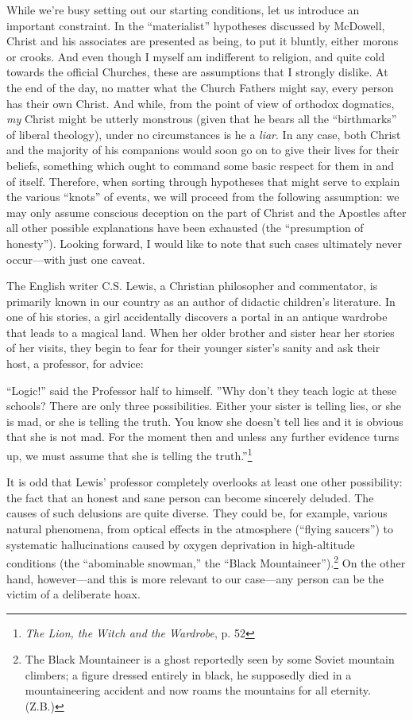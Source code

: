 While we're busy setting out our starting conditions, let us introduce an important constraint. In the ``materialist'' hypotheses discussed by McDowell, Christ and his associates are presented as being, to put it bluntly, either morons or crooks. And even though I myself am indifferent to religion, and quite cold towards the official Churches, these are assumptions that I strongly dislike. At the end of the day, no matter what the Church Fathers might say, every person has their own Christ. And while, from the point of view of orthodox dogmatics, \emph{my} Christ might be utterly monstrous (given that he bears all the ``birthmarks'' of liberal theology), under no circumstances is he a \emph{liar}. In any case, both Christ and the majority of his companions would soon go on to give their lives for their beliefs, something which ought to command some basic respect for them in and of itself. Therefore, when sorting through hypotheses that might serve to explain the various ``knots'' of events, we will proceed from the following assumption: we may only assume conscious deception on the part of Christ and the Apostles after all other possible explanations have been exhausted (the ``presumption of honesty''). Looking forward, I would like to note that such cases ultimately never occur---with just one caveat.

The English writer C.S. Lewis, a Christian philosopher and commentator, is
primarily known in our country as an author of didactic children's literature. In
one of his stories, a girl accidentally discovers a portal in an antique wardrobe that
leads to a magical land. When her older brother and sister hear her stories of her
visits, they begin to fear for their younger sister's sanity and ask their host, a
professor, for advice:

\begin{smallquote}
    ``Logic!'' said the Professor half to himself. ''Why don't they teach logic at these schools? There are only three possibilities. Either your sister is telling lies, or she is mad, or she is telling the truth. You know she doesn't tell lies and it is obvious that she is not mad. For the moment then and unless any further evidence turns up, we must assume that she is telling the truth.''\footnote{\emph{The Lion, the Witch and the Wardrobe}, p. 52}
\end{smallquote}

It is odd that Lewis' professor completely overlooks at least one other possibility: the fact that an honest and sane person can become sincerely deluded. The causes of such delusions are quite diverse. They could be, for example, various natural phenomena, from optical effects in the atmosphere (``flying saucers'') to systematic hallucinations caused by oxygen deprivation in high-altitude conditions (the ``abominable snowman,'' the ``Black Mountaineer'').\footnote{The Black Mountaineer is a ghost reportedly seen by some Soviet mountain climbers; a figure dressed entirely in black, he supposedly died in a mountaineering accident and now roams the mountains for all eternity. (Z.B.)} On the other hand, however---and this is more relevant to our case---any person can be the victim of a deliberate hoax.

